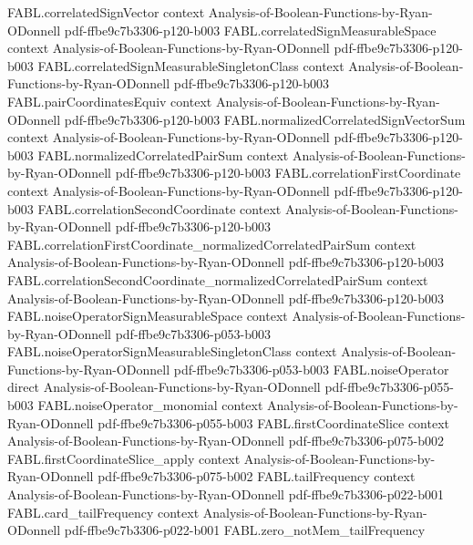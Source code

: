 \begin{theorem}
\proofstep
  {FABL.correlatedSignVector}
  {context}
  {Analysis-of-Boolean-Functions-by-Ryan-ODonnell}
  {pdf-ffbe9c7b3306-p120-b003}
\proofstep
  {FABL.correlatedSignMeasurableSpace}
  {context}
  {Analysis-of-Boolean-Functions-by-Ryan-ODonnell}
  {pdf-ffbe9c7b3306-p120-b003}
\proofstep
  {FABL.correlatedSignMeasurableSingletonClass}
  {context}
  {Analysis-of-Boolean-Functions-by-Ryan-ODonnell}
  {pdf-ffbe9c7b3306-p120-b003}
\proofstep
  {FABL.pairCoordinatesEquiv}
  {context}
  {Analysis-of-Boolean-Functions-by-Ryan-ODonnell}
  {pdf-ffbe9c7b3306-p120-b003}
\proofstep
  {FABL.normalizedCorrelatedSignVectorSum}
  {context}
  {Analysis-of-Boolean-Functions-by-Ryan-ODonnell}
  {pdf-ffbe9c7b3306-p120-b003}
\proofstep
  {FABL.normalizedCorrelatedPairSum}
  {context}
  {Analysis-of-Boolean-Functions-by-Ryan-ODonnell}
  {pdf-ffbe9c7b3306-p120-b003}
\proofstep
  {FABL.correlationFirstCoordinate}
  {context}
  {Analysis-of-Boolean-Functions-by-Ryan-ODonnell}
  {pdf-ffbe9c7b3306-p120-b003}
\proofstep
  {FABL.correlationSecondCoordinate}
  {context}
  {Analysis-of-Boolean-Functions-by-Ryan-ODonnell}
  {pdf-ffbe9c7b3306-p120-b003}
\proofstep
  {FABL.correlationFirstCoordinate_normalizedCorrelatedPairSum}
  {context}
  {Analysis-of-Boolean-Functions-by-Ryan-ODonnell}
  {pdf-ffbe9c7b3306-p120-b003}
\proofstep
  {FABL.correlationSecondCoordinate_normalizedCorrelatedPairSum}
  {context}
  {Analysis-of-Boolean-Functions-by-Ryan-ODonnell}
  {pdf-ffbe9c7b3306-p120-b003}
\proofstep
  {FABL.noiseOperatorSignMeasurableSpace}
  {context}
  {Analysis-of-Boolean-Functions-by-Ryan-ODonnell}
  {pdf-ffbe9c7b3306-p053-b003}
\proofstep
  {FABL.noiseOperatorSignMeasurableSingletonClass}
  {context}
  {Analysis-of-Boolean-Functions-by-Ryan-ODonnell}
  {pdf-ffbe9c7b3306-p053-b003}
\proofstep
  {FABL.noiseOperator}
  {direct}
  {Analysis-of-Boolean-Functions-by-Ryan-ODonnell}
  {pdf-ffbe9c7b3306-p055-b003}
\proofstep
  {FABL.noiseOperator_monomial}
  {context}
  {Analysis-of-Boolean-Functions-by-Ryan-ODonnell}
  {pdf-ffbe9c7b3306-p055-b003}
\proofstep
  {FABL.firstCoordinateSlice}
  {context}
  {Analysis-of-Boolean-Functions-by-Ryan-ODonnell}
  {pdf-ffbe9c7b3306-p075-b002}
\proofstep
  {FABL.firstCoordinateSlice_apply}
  {context}
  {Analysis-of-Boolean-Functions-by-Ryan-ODonnell}
  {pdf-ffbe9c7b3306-p075-b002}
\proofstep
  {FABL.tailFrequency}
  {context}
  {Analysis-of-Boolean-Functions-by-Ryan-ODonnell}
  {pdf-ffbe9c7b3306-p022-b001}
\proofstep
  {FABL.card_tailFrequency}
  {context}
  {Analysis-of-Boolean-Functions-by-Ryan-ODonnell}
  {pdf-ffbe9c7b3306-p022-b001}
\proofstep
  {FABL.zero_notMem_tailFrequency}

\end{theorem}
